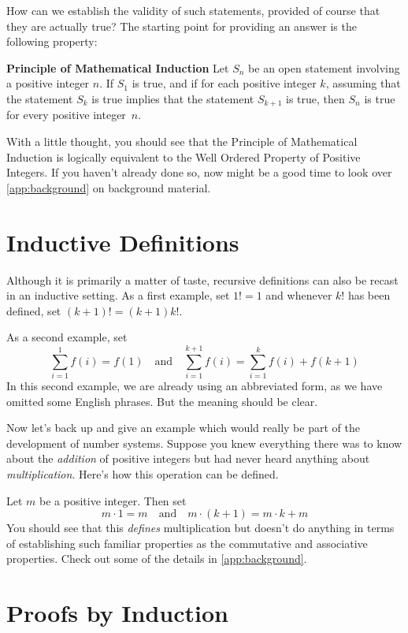 How can we establish the validity of such statements, provided of
course that they are actually true?  The starting point for providing
an answer is the following property:

\medskip 
\noindent\textbf{Principle of Mathematical Induction} Let $S_n$ be an open
statement involving a positive integer $n$.  If $S_1$ is true, and if
for each positive integer $k$, assuming that the statement $S_k$ is
true implies that the statement $S_{k+1}$ is true, then $S_n$ is true
for every positive integer~$n$.

\medskip With a little thought, you should see that the Principle of
Mathematical Induction is logically equivalent to the Well Ordered
Property of Positive Integers.  If you haven't already done so, now
might be a good time to look over \autoref{app:background} on background
material.
 
\section{Inductive Definitions}\label{s:induction:inductdefs}

Although it is primarily a matter of taste, recursive
definitions can also be recast in an inductive setting.
As a first example, set $1!=1$ and whenever $k!$ has
been defined, set $(k+1)!=(k+1)k!$.

As a second example, set
\[
\sum_{i=1}^1 f(i) = f(1)\quad\text{and}\quad
 \sum_{i=1}^{k+1} f(i)= \sum_{i=1}^{k} f(i)+ f(k+1) 
\]
In this second example, we are already using an abbreviated
form, as we have omitted some English phrases. 
But the meaning should be clear.

Now let's back up and give an example which would really
be part of the development of number systems.  Suppose
you knew everything there was to know about the \textit{addition}
of positive integers but had never heard anything about
\textit{multiplication}.  Here's how this operation can
be defined. 

Let $m$ be a positive integer.  Then set
\[
m\cdot1 = m\quad\text{and}\quad m\cdot(k+1)=m\cdot k+ m
\]
You should see that this \textit{defines} multiplication
but doesn't do anything in terms of establishing such
familiar properties as the commutative and associative
properties.  Check out some of the details in \autoref{app:background}. 

\section{Proofs by Induction}\label{s:induction:proofs}

